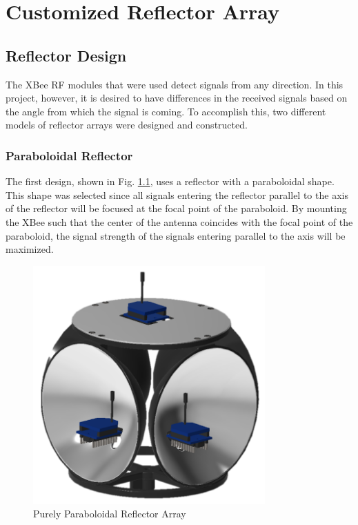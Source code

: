 \chapter{Customized Reflector Array}
\label{ch: Chapter3}

\section{Reflector Design}
The XBee RF modules that were used detect signals from any direction. In this project, however, it is desired to have differences in the received signals based on the angle from which the signal is coming. To accomplish this, two different models of reflector arrays were designed and constructed.

\subsection{Paraboloidal Reflector}
The first design, shown in Fig. \ref{fig:paraboloidalReflector}, uses a reflector with a paraboloidal shape. This shape was selected since all signals entering the reflector parallel to the axis of the reflector will be focused at the focal point of the paraboloid. By mounting the XBee such that the center of the antenna coincides with the focal point of the paraboloid, the signal strength of the signals entering parallel to the axis will be maximized.
\begin{figure}
    \centering
    \includegraphics[width=3.5in]{figs/img/paraboloidalReflector.png}
    \caption{Purely Paraboloidal Reflector Array}
    \label{fig:paraboloidalReflector}
\end{figure}

